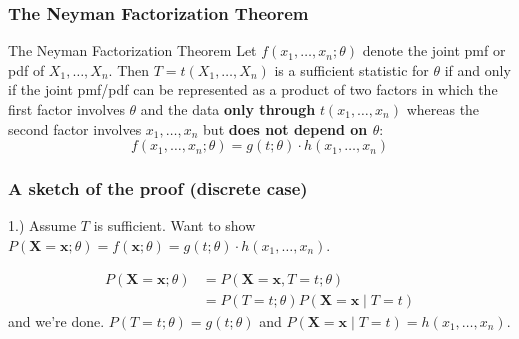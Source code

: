 \documentclass{beamer}
\begin{document}
\begin{frame}
\frametitle{The Neyman Factorization Theorem}


\begin{block}{The Neyman Factorization Theorem}
Let $f(x_1, \ldots, x_n ; \theta)$ denote the joint pmf or pdf of $X_1, \ldots, X_n$. Then $T = t(X_1, \ldots, X_n)$ is a sufficient statistic for $\theta$ if and only if the joint pmf/pdf can be represented as a product of two factors in which the first factor involves $\theta$ and the data {\bf only through} $t(x_1, \ldots, x_n)$ whereas the second factor involves $x_1, \ldots, x_n$ but {\bf does not depend on $\theta$}:
\[
f(x_1, \ldots, x_n ; \theta) = g(t;\theta) \cdot h(x_1, \ldots, x_n)
\]
\end{block}




\end{frame}


\begin{frame}
\frametitle{A sketch of the proof (discrete case)}

1.) Assume $T$ is sufficient. Want to show $P(\mathbf{X} = \mathbf{x}; \theta) = f(\mathbf{x};\theta) = g(t;\theta) \cdot h(x_1, \ldots, x_n)$.

\begin{align*}
P(\mathbf{X} = \mathbf{x}; \theta) &= P(\mathbf{X} = \mathbf{x}, T = t ; \theta) \\
&= P(T=t; \theta) P(\mathbf{X} = \mathbf{x}  \mid T=t)  
\end{align*}
and we're done. $P(T=t; \theta)  = g(t;\theta)$ and $P(\mathbf{X} = \mathbf{x} \mid T=t) = h(x_1, \ldots, x_n)$.

\end{frame}
\end{document}

